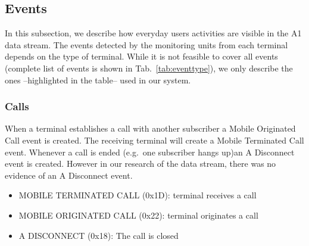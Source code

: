 \documentclass[master,english]{hgbthesis}
\begin{document}
\subsection{Events}
\label{subsec:events}
In this subsection, we describe how everyday users activities are visible in the A1 data stream. The events detected by the monitoring units from each terminal depends on the type of terminal. While it is not feasible to cover all events (complete list of events is shown in Tab.~\ref{tab:eventtype}), we only describe the ones --highlighted in the table-- used in our system.
\subsubsection{Calls}
When a terminal establishes a call with another subscriber a Mobile Originated Call event is created. The receiving terminal will create a Mobile Terminated Call event. Whenever a call is ended (e.g.\ one subscriber hangs up)an A Disconnect event is created. However in our research of the data stream, there was no evidence of an A Disconnect event.
\begin{itemize}
	\item MOBILE TERMINATED CALL (0x1D): terminal receives a call
	\item MOBILE ORIGINATED CALL (0x22): terminal originates a call
	\item A DISCONNECT (0x18): The call is closed
\end{itemize}
\end{document}
